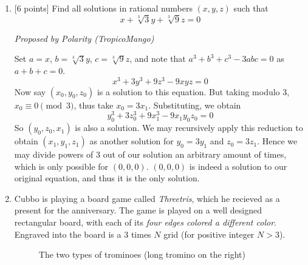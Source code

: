 \begin{enumerate}[align=left,start=1,label=\textbf{\textcolor{meablue}{Problem \arabic*}}]
\begin{solution}
    \end{solution}
    \item {[$6$ points]} Find all solutions in rational numbers $(x, y, z)$ such that
        \[x + \sqrt[3]{3}y + \sqrt[3]{9}z = 0\]

    \textrm{\emph{Proposed by Polarity (TropicoMango)}}

    \begin{solution}
        Set $a = x$, $b = \sqrt[3]{3}y$, $c = \sqrt[3]{9}z$, and note that $a^3 + b^3 + c^3 - 3abc = 0$ as $a + b + c = 0$. 
        \[x^3 + 3y^3 + 9z^3 - 9xyz = 0\]
        Now say $(x_0, y_0, z_0)$ is a solution to this equation. But taking modulo 3, $x_0 \equiv 0 \pmod{3}$, thus take $x_0 = 3x_1$. Substituting, we obtain 
        \[y_0^3 + 3z_0^3 + 9x_1^3 - 9x_1y_0z_0 = 0\]
        So $(y_0, z_0, x_1)$ is also a solution. We may recursively apply this reduction to obtain $(x_1, y_1, z_1)$ as another solution for $y_0 = 3y_1$ and $z_0 = 3z_1$. Hence we may divide powers of 3 out of our solution an arbitrary amount of times, which is only possible for $(0, 0, 0)$. $(0, 0, 0)$ is indeed a solution to our original equation, and thus it is the only solution.
    \end{solution}
    \item 
        Cubbo is playing a board game called \emph{Threetris}, which he recieved as a present for the anniversary. The game is played on a well designed rectangular board, with each of its \emph{four edges colored a different color}. Engraved into the board is a 3 times $N$ grid (for positive integer $N > 3$).
        \begin{figure}[!ht]
            \centering
            \caption{The two types of trominoes (long tromino on the right)}
        \end{figure}
        

\end{enumerate}
